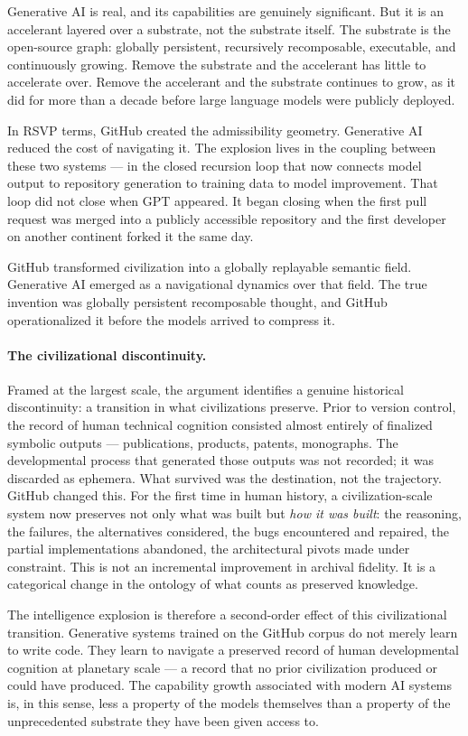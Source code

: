 \documentclass[11pt]{article}
\begin{document}
Generative AI is real, and its capabilities are genuinely significant. But it is
an accelerant layered over a substrate, not the substrate itself. The substrate
is the open-source graph: globally persistent, recursively recomposable,
executable, and continuously growing. Remove the substrate and the accelerant has
little to accelerate over. Remove the accelerant and the substrate continues to
grow, as it did for more than a decade before large language models were publicly
deployed.

In RSVP terms, GitHub created the admissibility geometry. Generative AI reduced
the cost of navigating it. The explosion lives in the coupling between these two
systems --- in the closed recursion loop that now connects model output to
repository generation to training data to model improvement. That loop did not
close when GPT appeared. It began closing when the first pull request was merged
into a publicly accessible repository and the first developer on another
continent forked it the same day.

GitHub transformed civilization into a globally replayable semantic field.
Generative AI emerged as a navigational dynamics over that field. The true
invention was globally persistent recomposable thought, and GitHub
operationalized it before the models arrived to compress it.

\paragraph{The civilizational discontinuity.}
Framed at the largest scale, the argument identifies a genuine historical
discontinuity: a transition in what civilizations preserve. Prior to version
control, the record of human technical cognition consisted almost entirely of
finalized symbolic outputs --- publications, products, patents, monographs.
The developmental process that generated those outputs was not recorded;
it was discarded as ephemera. What survived was the destination, not the
trajectory. GitHub changed this. For the first time in human history, a
civilization-scale system now preserves not only what was built but
\emph{how it was built}: the reasoning, the failures, the alternatives
considered, the bugs encountered and repaired, the partial implementations
abandoned, the architectural pivots made under constraint. This is not an
incremental improvement in archival fidelity. It is a categorical change in
the ontology of what counts as preserved knowledge.

The intelligence explosion is therefore a second-order effect of this
civilizational transition. Generative systems trained on the GitHub corpus
do not merely learn to write code. They learn to navigate a preserved record
of human developmental cognition at planetary scale --- a record that no
prior civilization produced or could have produced. The capability growth
associated with modern AI systems is, in this sense, less a property of
the models themselves than a property of the unprecedented substrate they
have been given access to.
\end{document}
